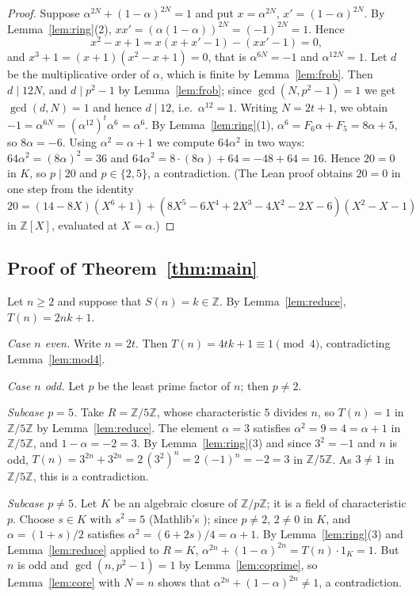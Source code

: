 \documentclass[11pt]{amsart}
\theoremstyle{plain}
\theoremstyle{definition}
\newcommand{\Z}{\mathbb{Z}}
\begin{document}
\begin{proof}
Suppose $\alpha^{2N}+(1-\alpha)^{2N}=1$ and put $x=\alpha^{2N}$, $x'=(1-\alpha)^{2N}$.
By Lemma~\ref{lem:ring}(2), $xx'=(\alpha(1-\alpha))^{2N}=(-1)^{2N}=1$. Hence
\[
  x^2-x+1=x(x+x'-1)-(xx'-1)=0,
\]
and $x^3+1=(x+1)(x^2-x+1)=0$, that is $\alpha^{6N}=-1$ and $\alpha^{12N}=1$.
Let $d$ be the multiplicative order of $\alpha$, which is finite by Lemma~\ref{lem:frob}.
Then $d\mid 12N$, and $d\mid p^2-1$ by Lemma~\ref{lem:frob}; since $\gcd(N,p^2-1)=1$ we get $\gcd(d,N)=1$ and hence $d\mid 12$, i.e.\ $\alpha^{12}=1$.
Writing $N=2t+1$, we obtain $-1=\alpha^{6N}=(\alpha^{12})^t\alpha^6=\alpha^6$.
By Lemma~\ref{lem:ring}(1), $\alpha^6=F_6\alpha+F_5=8\alpha+5$, so $8\alpha=-6$.
Using $\alpha^2=\alpha+1$ we compute $64\alpha^2$ in two ways:
$64\alpha^2=(8\alpha)^2=36$ and $64\alpha^2=8\cdot(8\alpha)+64=-48+64=16$.
Hence $20=0$ in $K$, so $p\mid20$ and $p\in\{2,5\}$, a contradiction.
(The Lean proof obtains $20=0$ in one step from the identity
$20=(14-8X)(X^6+1)+(8X^5-6X^4+2X^3-4X^2-2X-6)(X^2-X-1)$ in $\Z[X]$, evaluated at $X=\alpha$.)
\end{proof}

\subsection{\texorpdfstring{Proof of Theorem~\ref{thm:main}}{Proof of Theorem 1}}\label{sec:assembly}
Let $n\ge2$ and suppose that $S(n)=k\in\Z$. By Lemma~\ref{lem:reduce}, $T(n)=2nk+1$.

\emph{Case $n$ even.} Write $n=2t$. Then $T(n)=4tk+1\equiv1\pmod4$, contradicting Lemma~\ref{lem:mod4}.

\emph{Case $n$ odd.} Let $p$ be the least prime factor of $n$; then $p\ne2$.

\emph{Subcase $p=5$.} Take $R=\Z/5\Z$, whose characteristic $5$ divides $n$, so $T(n)=1$ in $\Z/5\Z$ by Lemma~\ref{lem:reduce}.
The element $\alpha=3$ satisfies $\alpha^2=9=4=\alpha+1$ in $\Z/5\Z$, and $1-\alpha=-2=3$.
By Lemma~\ref{lem:ring}(3) and since $3^2=-1$ and $n$ is odd,
$T(n)=3^{2n}+3^{2n}=2\,(3^2)^n=2\,(-1)^n=-2=3$ in $\Z/5\Z$. As $3\ne1$ in $\Z/5\Z$, this is a contradiction.

\emph{Subcase $p\ne5$.} Let $K$ be an algebraic closure of $\Z/p\Z$; it is a field of characteristic $p$.
Choose $s\in K$ with $s^2=5$ (Mathlib's ); since $p\ne2$, $2\ne0$ in $K$, and $\alpha=(1+s)/2$ satisfies
$\alpha^2=(6+2s)/4=\alpha+1$.
By Lemma~\ref{lem:ring}(3) and Lemma~\ref{lem:reduce} applied to $R=K$, $\alpha^{2n}+(1-\alpha)^{2n}=T(n)\cdot1_K=1$.
But $n$ is odd and $\gcd(n,p^2-1)=1$ by Lemma~\ref{lem:coprime}, so Lemma~\ref{lem:core} with $N=n$ shows that $\alpha^{2n}+(1-\alpha)^{2n}\ne1$, a contradiction.
\end{document}
